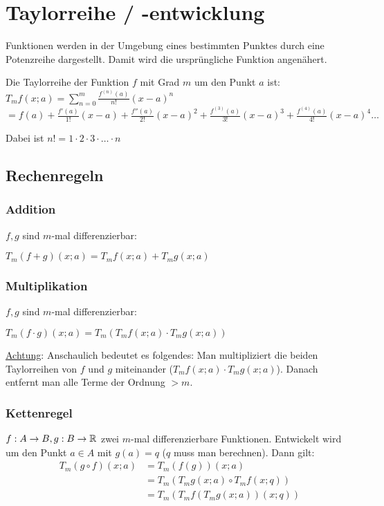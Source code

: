 \section{Taylorreihe / -entwicklung}
Funktionen werden in der Umgebung eines bestimmten Punktes durch eine
Potenzreihe dargestellt. Damit wird die ursprüngliche Funktion angenähert.

Die Taylorreihe der Funktion $f$ mit Grad $m$ um den Punkt $a$ ist:
$T_m f(x;a) = \sum_{n = 0}^m \frac{f^{(n)}(a)}{n!}(x - a)^n$\newline
{\small
$= f(a) + \frac{f'(a)}{1!}(x-a) + \frac{f''(a)}{2!}(x-a)^2 +
\frac{f^{(3)}(a)}{3!}(x-a)^3 + \frac{f^{(4)}(a)}{4!}(x-a)^4\ldots$
}

Dabei ist $n! = 1 \cdot 2 \cdot 3 \cdot \ldots \cdot n$

\subsection{Rechenregeln}
\subsubsection{Addition}
$f, g$ sind $m$-mal differenzierbar:

$T_m (f + g)(x;a) = T_m f(x;a) + T_m g(x;a)$

\subsubsection{Multiplikation}
$f, g$ sind $m$-mal differenzierbar:

$T_m (f \cdot g)(x;a) = T_m(T_m f(x;a) \cdot T_m g(x;a))$

\underline{Achtung}: Anschaulich bedeutet es folgendes: Man
multipliziert die beiden Taylorreihen von $f$ und $g$ miteinander ($T_m f(x;a) \cdot T_m g(x;a)$).
Danach entfernt man alle Terme der Ordnung $> m$.

\subsubsection{Kettenregel}
$f: A \to B, g: B \to \mathbb{R}$ zwei $m$-mal differenzierbare Funktionen.
Entwickelt wird um den Punkt $a \in A$ mit $g(a) = q$ ($q$ muss man berechnen).
Dann gilt:
\begin{align*}
T_m (g \circ f)(x;a) &= T_m (f(g))(x;a)\\
&= T_m(T_m g(x;a) \circ T_m f(x;q))\\
& = T_m(T_m f(T_m g(x;a))(x;q))
\end{align*}

